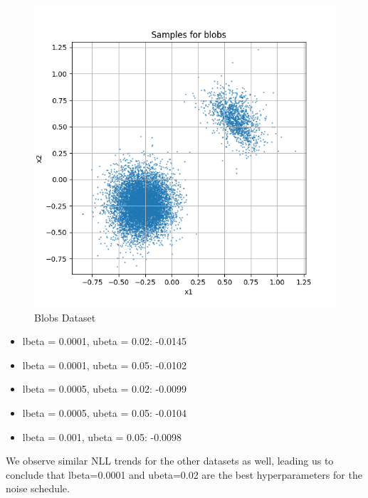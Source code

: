 \documentclass[a4paper,12pt]{article}
\begin{document}
\begin{figure}[H]
\begin{minipage}{0.3\textwidth}
  \end{minipage}
  \begin{minipage}{0.3\textwidth}
      \centering
      \includegraphics[width=\linewidth]{"images/Samples for ddpm_2_200_0.001_0.05_blobs_linear.png"}
  \end{minipage}

  \caption{Blobs Dataset}
\end{figure}

\begin{itemize}
  \item lbeta = 0.0001, ubeta = 0.02: -0.0145
  \item lbeta = 0.0001, ubeta = 0.05: -0.0102
  \item lbeta = 0.0005, ubeta = 0.02: -0.0099
  \item lbeta = 0.0005, ubeta = 0.05: -0.0104
  \item lbeta = 0.001, ubeta = 0.05: -0.0098
\end{itemize}
We observe similar NLL trends for the other datasets as well, leading us to conclude that lbeta=0.0001 and ubeta=0.02 are the best hyperparameters for the noise schedule.
\end{document}
